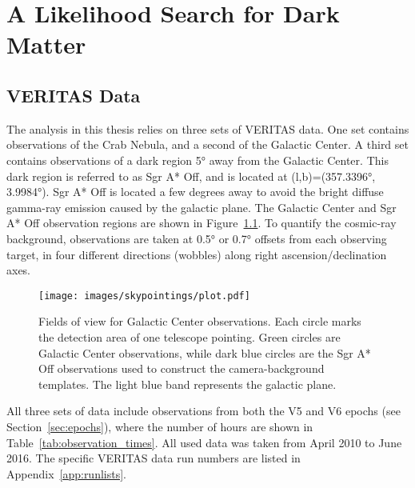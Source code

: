 \cleartooddpage[\thispagestyle{empty}]
\newcommand{\Like}{L}
\newcommand{\LogLike}{\mathcal{L}}
\newcommand{\LogLikeMax}{\LogLike_{\textrm{max}}}
\newcommand{\xtrue}{x}
\newcommand{\xdet }{x'}
\newcommand{\ltrue}{l}
\newcommand{\ldet }{l'}
\newcommand{\btrue}{b}
\newcommand{\bdet }{b'}
\newcommand{\Etrue}{E}
\newcommand{\Edet }{E'}
\newcommand{\ttrue}{t}
\newcommand{\tdet }{t'}
\newcommand{\Aeff }{A_\textrm{eff }}
\newcommand{\Edisp}{E_\textrm{disp}}
\newcommand{\Mnull}{M_\textrm{null}}
\newcommand{\Malt }{M_\textrm{alt}}

\chapter{A Likelihood Search for Dark Matter}\label{chapter:analysis}

\section{VERITAS Data}\label{veritasdata}
  The analysis in this thesis relies on three sets of VERITAS data.
  One set contains observations of the Crab Nebula, and a second of the Galactic Center.
  A third set contains observations of a dark region \nicetilde\ang{5} away from the Galactic Center.
  This dark region is referred to as  Sgr A* Off, and is located at (l,b)=(\ang{357.3396}, \ang{3.9984}).
  Sgr A* Off is located a few degrees away to avoid the bright diffuse gamma-ray emission caused by the galactic plane.
  The Galactic Center and Sgr A* Off observation regions are shown in Figure~\ref{fig:gcfieldsofview}.
  To quantify the cosmic-ray background, observations are taken at \ang{0.5} or \ang{0.7} offsets from each observing target, in four different directions (wobbles) along right ascension/declination axes.

  \begin{figure}[!ht]
    \centering
    \texttt{[image: images/skypointings/plot.pdf]}
    \caption[VERITAS Galactic Center Pointings]{
      Fields of view for Galactic Center observations.
      Each circle marks the detection area of one telescope pointing.
      Green circles are Galactic Center observations, while dark blue circles are the Sgr A* Off observations used to construct the camera-background templates.
      The light blue band represents the galactic plane.
    }
    \label{fig:gcfieldsofview}
  \end{figure}

  All three sets of data include observations from both the V5 and V6 epochs (see Section~\ref{sec:epochs}), where the number of hours are shown in Table~\ref{tab:observation_times}.
  All used data was taken from April 2010 to June 2016.
  The specific VERITAS data run numbers are listed in Appendix~\ref{app:runlists}.

